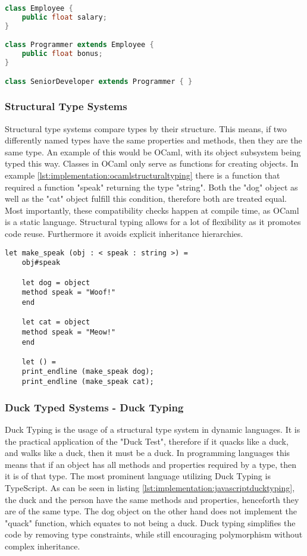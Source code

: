 \begin{lstlisting}[language=Java,caption=Example of nominal typing in java,label=lst:implementation:javanominaltyping]
class Employee {
	public float salary;
}

class Programmer extends Employee {
	public float bonus;
}

class SeniorDeveloper extends Programmer { }
\end{lstlisting}

\subsubsection{Structural Type Systems}

Structural type systems compare types by their structure. This means, if two differently named types have the same properties and methods, then they are the same type. An example of this would be OCaml, with its object subsystem being typed this way. Classes in OCaml only serve as functions for creating objects. In example \ref{lst:implementation:ocamlstructuraltyping} there is a function that required a function "speak" returning the type "string". Both the "dog" object as well as the "cat" object fulfill this condition, therefore both are treated equal. Most importantly, these compatibility checks happen at compile time, as OCaml is a static language. Structural typing allows for a lot of flexibility as it promotes code reuse. Furthermore it avoids explicit inheritance hierarchies.

\begin{lstlisting}[language=caml,caption=Example of structural typing in Ocaml,label=lst:implementation:ocamlstructuraltyping]
	let make_speak (obj : < speak : string >) =
	obj#speak

	let dog = object
	method speak = "Woof!"
	end

	let cat = object
	method speak = "Meow!"
	end

	let () =
	print_endline (make_speak dog);
	print_endline (make_speak cat);
\end{lstlisting}

\subsubsection{Duck Typed Systems - Duck Typing}

Duck Typing is the usage of a structural type system in dynamic languages. It is the practical application of the "Duck Test", therefore if it quacks like a duck, and walks like a duck, then it must be a duck. In programming languages this means that if an object has all methods and properties required by a type, then it is of that type. The most prominent language utilizing Duck Typing is TypeScript. As can be seen in listing \ref{lst:implementation:javascriptducktyping}, the duck and the person have the same methods and properties, henceforth they are of the same type. The dog object on the other hand does not implement the "quack" function, which equates to not being a duck. Duck typing simplifies the code by removing type constraints, while still encouraging polymorphism without complex inheritance.

